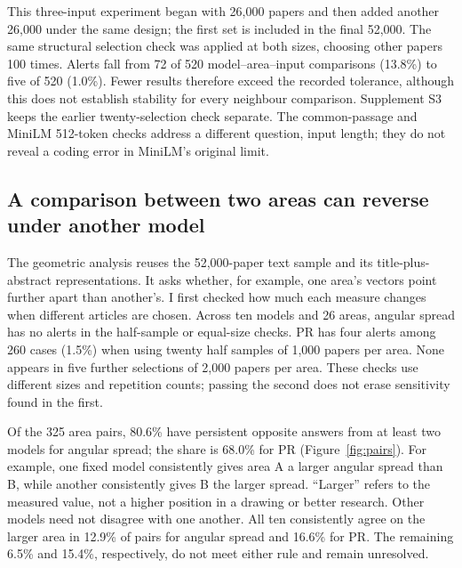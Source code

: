 \documentclass[12pt]{article}
\begin{document}
This three-input experiment began with 26,000 papers and then added another 26,000 under the same design; the first set is included in the final 52,000. The same structural selection check was applied at both sizes, choosing other papers 100 times. Alerts fall from 72 of 520 model--area--input comparisons (13.8\%) to five of 520 (1.0\%). Fewer results therefore exceed the recorded tolerance, although this does not establish stability for every neighbour comparison. Supplement S3 keeps the earlier twenty-selection check separate. The common-passage and MiniLM 512-token checks address a different question, input length; they do not reveal a coding error in MiniLM's original limit.

\FloatBarrier
\subsection{A comparison between two areas can reverse under another model}
The geometric analysis reuses the 52,000-paper text sample and its title-plus-abstract representations. It asks whether, for example, one area's vectors point further apart than another's. I first checked how much each measure changes when different articles are chosen. Across ten models and 26 areas, angular spread has no alerts in the half-sample or equal-size checks. PR has four alerts among 260 cases (1.5\%) when using twenty half samples of 1,000 papers per area. None appears in five further selections of 2,000 papers per area. These checks use different sizes and repetition counts; passing the second does not erase sensitivity found in the first.

Of the 325 area pairs, 80.6\% have persistent opposite answers from at least two models for angular spread; the share is 68.0\% for PR (Figure~\ref{fig:pairs}). For example, one fixed model consistently gives area A a larger angular spread than B, while another consistently gives B the larger spread. ``Larger'' refers to the measured value, not a higher position in a drawing or better research. Other models need not disagree with one another. All ten consistently agree on the larger area in 12.9\% of pairs for angular spread and 16.6\% for PR. The remaining 6.5\% and 15.4\%, respectively, do not meet either rule and remain unresolved.
\end{document}
